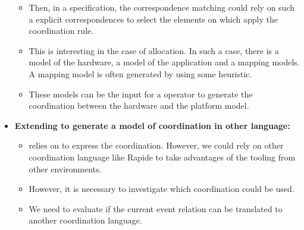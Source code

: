 \begin{itemize}
\begin{itemize}
			\item Then, in a \bcool specification, the correspondence matching could rely on such a explicit correspondences to select the elements on which apply the coordination rule.
		 
			 \item This is interesting in the case of allocation. In such a case, there is a model of the hardware, a model of the application and a mapping models. A mapping model is often generated by using some heuristic. 
			 
			 \item These models can be the input for a \bcool operator to generate the coordination between the hardware and the platform model.  
		\end{itemize}
			\item \textbf{Extending \bcool to generate a model of coordination in other language:} 
			\begin{itemize}
				\item \bcool relies on \ccsl to express the coordination. However, we could rely on other coordination language like Rapide to take advantages of the tooling from other environments.
				
				\item However, it is necessary to investigate which coordination could be used.
				
				\item We need to evaluate if the current event relation can be translated to another coordination language.
				         
			\end{itemize}
\end{itemize}
